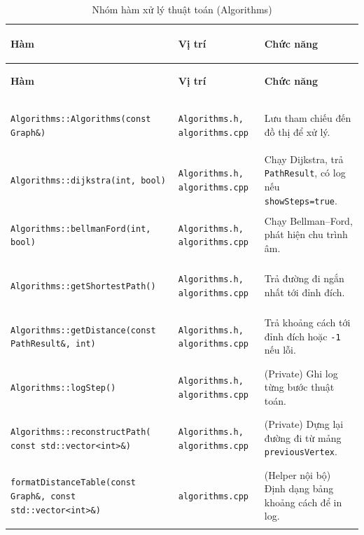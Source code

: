 \documentclass[14pt,a4paper]{report}
\begin{document}
\begin{longtable}{|>{\bfseries\raggedright\arraybackslash}p{}|
                   >{\bfseries\raggedright\arraybackslash}p{2.9cm}|
                   >{\raggedright\arraybackslash}p{}|}
\caption{ Nhóm hàm xử lý thuật toán (Algorithms)}\\
\hline
\rowcolor{headergray}
\color{white}\textbf{Hàm} & \color{white}\textbf{Vị trí} & \color{white}\textbf{Chức năng} \\
\hline
\endfirsthead

\hline
\rowcolor{headergray}
\color{white}\textbf{Hàm} & \color{white}\textbf{Vị trí} & \color{white}\textbf{Chức năng} \\
\hline
\endhead

\hline
\endfoot

\hline
\endlastfoot

\texttt{Algorithms::Algorithms(const Graph\&)} &
\texttt{Algorithms.h, algorithms.cpp} &
Lưu tham chiếu đến đồ thị để xử lý.\\ \hline

\texttt{Algorithms::dijkstra(int, bool)} &
\texttt{Algorithms.h, algorithms.cpp} &
Chạy Dijkstra, trả \texttt{PathResult}, có log nếu \texttt{showSteps=true}.\\ \hline

\texttt{Algorithms::bellmanFord(int, bool)} &
\texttt{Algorithms.h, algorithms.cpp} &
Chạy Bellman--Ford, phát hiện chu trình âm.\\ \hline

\texttt{Algorithms::getShortestPath()} &
\texttt{Algorithms.h, algorithms.cpp} &
Trả đường đi ngắn nhất tới đỉnh đích.\\ \hline

\texttt{Algorithms::getDistance(const PathResult\&, int)} &
\texttt{Algorithms.h, algorithms.cpp} &
Trả khoảng cách tới đỉnh đích hoặc \texttt{-1} nếu lỗi.\\ \hline

\texttt{Algorithms::logStep()} &
\texttt{Algorithms.h, algorithms.cpp} &
(Private) Ghi log từng bước thuật toán.\\ \hline

\texttt{Algorithms::reconstructPath( const std::vector<int>\&)} &
\texttt{Algorithms.h, algorithms.cpp} &
(Private) Dựng lại đường đi từ mảng \texttt{previousVertex}.\\ \hline

\texttt{formatDistanceTable(const Graph\&, const std::vector<int>\&)} &
\texttt{algorithms.cpp} &
(Helper nội bộ) Định dạng bảng khoảng cách để in log.\\ \hline

\end{longtable}
\end{document}
